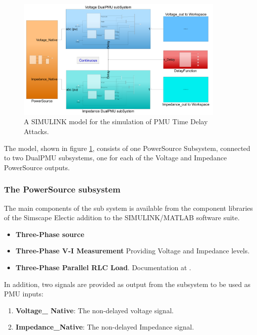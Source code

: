  \begin{figure}[t]
 \begin{center}
\includegraphics[width=0.90\textwidth]{figures/pmuSIM-overviewH.png}
\caption[PmuSIM SIMULINK model]{A SIMULINK model for the simulation of PMU Time Delay Attacks.}
\label{fig:PMUsim-Overview}
     
 \end{center}
\end{figure}

The model, shown in figure \ref{fig:PMUsim-Overview}, consists of one PowerSource Subsystem, connected to two DualPMU subsystems, one for each of the Voltage and Impedance PowerSource outputs.

\subsubsection{The PowerSource subsystem}

The main components of the sub system is available from the component libraries of the Simscape Electic addition to the SIMULINK/MATLAB software suite.
\begin{itemize}
    \item \textbf{Three-Phase source} 
    \item \textbf{Three-Phase V-I Measurement}  Providing Voltage and Impedance levels.
    \item \textbf{Three-Phase Parallel RLC Load}. Documentation at \cite{mathworksImplementThreephase}. 
\end{itemize}
In addition, two signals are provided as output from the subsystem to be used as PMU inputs:
\begin{enumerate}
    \item \textbf{Voltage\_ Native}: The non-delayed voltage signal.
    \item \textbf{Impedance\_Native}: The non-delayed Impedance signal.
\end{enumerate}

